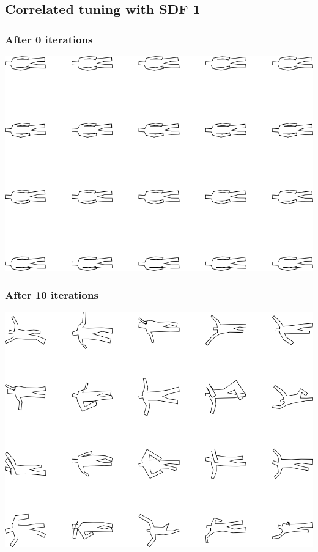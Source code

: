 \subsection{Correlated tuning with SDF 1}

\subsubsection{After 0 iterations}

\includegraphics[width=6in]{output/3.learning/correlated_tuning/correlated_tuning_iter0_.png}
\subsubsection{After 10 iterations}

\includegraphics[width=6in]{output/3.learning/correlated_tuning/correlated_tuning_iter10_.png}
